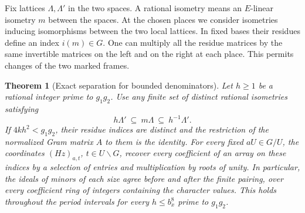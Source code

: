 \documentclass[a4paper,11pt]{article}
\newtheorem{theorem}[proposition]{Theorem}
\theoremstyle{definition}
\theoremstyle{remark}
\numberwithin{equation}{section}
\begin{document}
Fix lattices \(\Lambda,\Lambda'\) in the two spaces. A rational
isometry means an \(E\)-linear isometry \(m\) between the spaces.
At the chosen places we consider isometries inducing isomorphisms
between the two local lattices. In fixed bases their residues define
an index \(i(m)\in G\). One can multiply all the residue matrices
by the same invertible matrices on the left and on the right at
each place. This permits changes of the two marked frames.

\begin{theorem}[Exact separation for bounded denominators]
\leavevmode\label{thm:definiteseparation530}
Let \(h\ge1\) be a rational integer prime to \(g_1g_2\). Use any
finite set of distinct rational isometries satisfying
\[
                  h\Lambda'\ \subseteq\ m\Lambda\
                                   \subseteq\ h^{-1}\Lambda'.
\]
If \(4kh^2<g_1g_2\), their residue indices are distinct and the
restriction of the normalized Gram matrix \(A\) to them is the
identity. For \emph{every} fixed \(aU\in G/U\), the coordinates
\((Hz)_{a,t}\), \(t\in U\backslash G\), recover every coefficient
of an array on these indices by a selection of entries and
multiplication by roots of unity. In particular, the ideals of
minors of each size agree before and after the finite pairing,
over every coefficient ring of integers containing the character
values. This holds throughout the period intervals for every
\(h\le b_x^8\) prime to \(g_1g_2\).
\end{theorem}
\end{document}
